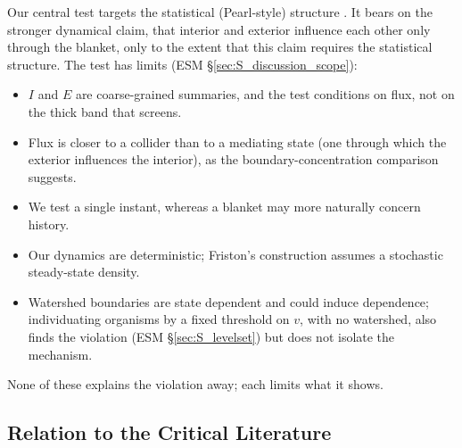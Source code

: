 \documentclass[11pt]{article}
\begin{document}
Our central test targets the statistical (Pearl-style) structure \citep{Bruineberg2022,Pearl1988}. It bears on the stronger dynamical claim, that interior and exterior influence each other only through the blanket, only to the extent that this claim requires the statistical structure. The test has limits (ESM \S\ref{sec:S_discussion_scope}):
\begin{itemize}
\item $I$ and $E$ are coarse-grained summaries, and the test conditions on flux, not on the thick band that screens.
\item Flux is closer to a collider than to a mediating state (one through which the exterior influences the interior), as the boundary-concentration comparison suggests.
\item We test a single instant, whereas a blanket may more naturally concern history.
\item Our dynamics are deterministic; Friston's construction assumes a stochastic steady-state density.
\item Watershed boundaries are state dependent and could induce dependence; individuating organisms by a fixed threshold on $v$, with no watershed, also finds the violation (ESM \S\ref{sec:S_levelset}) but does not isolate the mechanism.
\end{itemize}
None of these explains the violation away; each limits what it shows.

\subsection{Relation to the Critical Literature}
\label{sec:critical_lit}
\end{document}

